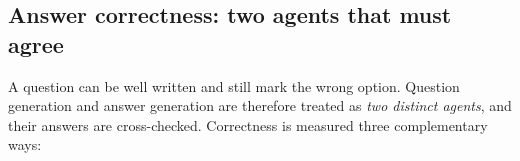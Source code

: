 
\subsection{Answer correctness: two agents that must agree}
\label{sec:meth-answer}

A question can be well written and still mark the wrong option. Question generation
and answer generation are therefore treated as \emph{two distinct agents}, and their
answers are cross-checked. Correctness is measured three complementary ways:

